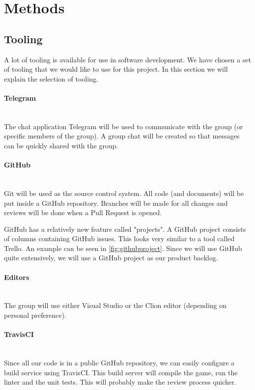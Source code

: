 \section{Methods}

\subsection{Tooling}
A lot of tooling is available for use in software development. We have chosen a set of tooling that we would like to use for this project. In this section we will explain the selection of tooling.

\paragraph{Telegram}
~\\ The chat application Telegram will be used to communicate with the group (or specific members of the group). A group chat will be created so that messages can be quickly shared with the group.

\paragraph{GitHub}
~\\ Git will be used as the source control system. All code (and documents) will be put inside a GitHub repository. Branches will be made for all changes and reviews will be done when a Pull Request is opened.

GitHub has a relatively new feature called "projects". A GitHub project consists of columns containing GitHub issues. This looks very similar to a tool called Trello. An example can be seen in \cref{fig:githubproject}. Since we will use GitHub quite extensively, we will use a GitHub project as our product backlog.

\paragraph{Editors}
~\\ The group will use either Visual Studio or the Clion editor (depending on personal preference). 

\paragraph{TravisCI}
~\\ Since all our code is in a public GitHub repository, we can easily configure a build service using TravisCI. This build server will compile the game, run the linter and the unit tests. This will probably make the review process quicker.
 


